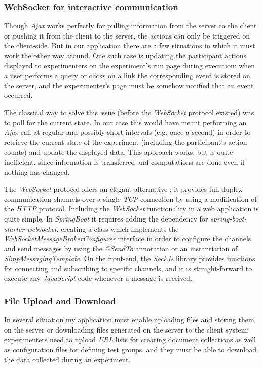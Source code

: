 \documentclass[a4paper]{usiinfbachelorproject}
\begin{document}
\subsubsection{\textbf{WebSocket for interactive communication}}

Though \emph{Ajax} works perfectly for pulling information from the server to the client or pushing it from the 
client to the server, the actions can only be triggered on the client-side. But in our application there
are a few situations in which it must work the other way around. One such case is updating the participant actions displayed to
experimenters on the experiment's run page during execution: when a user performs a query or clicks on a link 
the corresponding event is stored on the server, and the experimenter's page must be somehow notified that an event occurred.

The classical way to solve this issue (before the \emph{WebSocket} protocol existed) was to poll for the
current state. In our case this would have meant performing an \emph{Ajax} call at regular and possibly short intervals 
(e.g. once a second) in order to retrieve the current state of the experiment (including the participant's action counts)
and update the displayed data.
This approach works, but is quite inefficient, since information is transferred and computations are done even if nothing
has changed.

The \emph{WebSocket} protocol offers an elegant alternative \cite{websocketWikipedia}: it provides full-duplex communication channels
over a single \emph{TCP} connection by using a modification of the \emph{HTTP} protocol. Including the \emph{WebSocket} functionality
in a web application is quite simple. In \emph{SpringBoot} it requires adding the dependency for \emph{spring-boot-starter-websocket},
creating a class which implements the \emph{WebSocketMessageBrokerConfigurer} interface in order to configure the channels, and
send messages by using the \emph{@SendTo} annotation or an instantiation of \emph{SimpMessagingTemplate}.
On the front-end, the \emph{SockJs} library provides functions for connecting and subscribing to specific channels, and it is 
straight-forward to execute any \emph{JavaScript} code whenever a message is received.  


\subsubsection{\textbf{File Upload and Download}}

In several situation my application must enable uploading files and storing them on the server or downloading files 
generated on the server to the client system: experimenters need to upload \emph{URL} lists for creating document collections as well as 
configuration files for defining test groups, and they must be able to download the data collected during an experiment.
\end{document}
